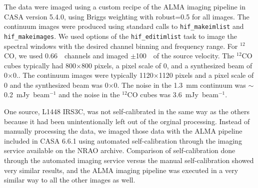 The data were imaged using a custom recipe of the ALMA imaging pipeline in CASA version 5.4.0, using Briggs weighting with robust=0.5 for all images. 
The continuum images were produced using standard 
calls to \texttt{hif\_makeimlist} and \texttt{hif\_makeimages}. We used options of the \texttt{hif\_editimlist}
task to image the spectral windows with the desired channel binning and frequency range. For $^{12}$CO, we used 0.66~\kms\ channels
and imaged $\pm$100~\kms\ of the source velocity. The $^{12}$CO cubes typically had 800$\times$800 pixels, a pixel scale of 0, and a synthesized beam of 0$\times$0.. The continuum images were typically 1120$\times$1120 pixels and a pixel scale of 0 and the synthesized beam was 0$\times$0. The noise in the 1.3~mm continuum was $\sim$0.2~mJy~beam$^{-1}$ and the noise in the $^{12}$CO cubes was 3.6~mJy~beam$^{-1}$.

One source, L1448 IRS3C, was not self-calibrated in the same way as the others because it had been unintentionally left out of the orginal processing. Instead
of manually processing the data, we imaged those data with the ALMA pipeline included in CASA 6.6.1 using automated self-calibration through
the imaging service available on the NRAO archive. Comparison of self-calibration done through the automated imaging
service versus the manual self-calibration showed very similar results, and the ALMA imaging pipeline was executed in a very similar way to all the other images as well.


